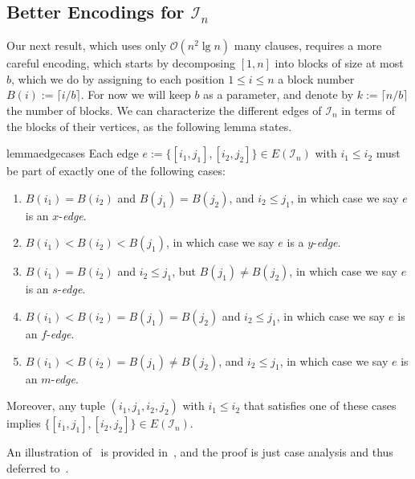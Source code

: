 \documentclass[11pt]{article}
\renewcommand{\O}{\mathcal{O}}
\begin{document}
\subsection{\texorpdfstring{Better Encodings for $\mathcal{I}_n$}{Better Encodings for In}}
Our next result, which uses only $\O(n^2 \lg n)$ many clauses, requires a more careful encoding, which starts by decomposing $[1, n]$ into blocks of size at most $b$, which we do by assigning to each position $1 \leq i \leq n$ a block number $B(i) := \lceil i/b\rceil$. For now we will keep $b$ as a parameter, and denote by $k := \lceil n/b\rceil$ the number of blocks. 
We can characterize the different edges of $\mathcal{I}_n$ in terms of the blocks of their vertices, as the following lemma states.
\begin{restatable}{lemma}{edgecases}\label{lemma:edge_cases}
    Each edge $e := \{[i_1, j_1], [i_2, j_2]\} \in E(\mathcal{I}_n)$ with $i_1 \leq i_2$ must be part of exactly one of the following cases:
    \begin{enumerate}
        \item $B(i_1) = B(i_2)$ and $B(j_1) = B(j_2)$, and $i_2 \leq j_1$, in which case we say $e$ is an $x$-\emph{edge}.
        \item $B(i_1) < B(i_2) < B(j_1)$, in which case we say $e$ is a $y$-\emph{edge}.
        \item $B(i_1) = B(i_2)$ and $i_2 \leq j_1$, but $B(j_1) \neq B(j_2)$, in which case we say $e$ is an $s$-\emph{edge}.
        \item $B(i_1) < B(i_2) = B(j_1) = B(j_2)$ and $i_2 \leq j_1$, in which case we say $e$ is an $f$-\emph{edge}.
        \item $B(i_1) < B(i_2) = B(j_1) \neq B(j_2)$, and $i_2 \leq j_1$, in which case we say $e$ is an $m$-\emph{edge}.
    \end{enumerate}
    Moreover, any tuple $(i_1, j_1, i_2, j_2)$ with $i_1 \leq i_2$ that satisfies one of these cases implies $\{[i_1, j_1], [i_2, j_2]\} \in E(\mathcal{I}_n)$.
\end{restatable}

An illustration of~ is provided in~, and the proof is just case analysis and thus deferred to~.

\end{document}
